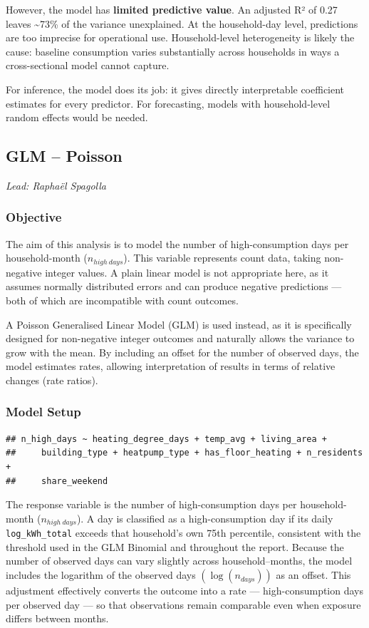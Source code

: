 \documentclass[
]{article}
\begin{document}
However, the model has \textbf{limited predictive value}. An adjusted R²
of 0.27 leaves \textasciitilde73\% of the variance unexplained. At the
household-day level, predictions are too imprecise for operational use.
Household-level heterogeneity is likely the cause: baseline consumption
varies substantially across households in ways a cross-sectional model
cannot capture.

For inference, the model does its job: it gives directly interpretable
coefficient estimates for every predictor. For forecasting, models with
household-level random effects would be needed.

\subsection{GLM -- Poisson}\label{glm-poisson}

\emph{Lead: Raphaël Spagolla}

\subsubsection{Objective}\label{objective-1}

The aim of this analysis is to model the number of high-consumption days
per household-month (\(n_{high\ days}\)). This variable represents count
data, taking non-negative integer values. A plain linear model is not
appropriate here, as it assumes normally distributed errors and can
produce negative predictions --- both of which are incompatible with
count outcomes.

A Poisson Generalised Linear Model (GLM) is used instead, as it is
specifically designed for non-negative integer outcomes and naturally
allows the variance to grow with the mean. By including an offset for
the number of observed days, the model estimates rates, allowing
interpretation of results in terms of relative changes (rate ratios).

\subsubsection{Model Setup}\label{model-setup-1}

\begin{verbatim}
## n_high_days ~ heating_degree_days + temp_avg + living_area + 
##     building_type + heatpump_type + has_floor_heating + n_residents + 
##     share_weekend
\end{verbatim}

The response variable is the number of high-consumption days per
household-month (\(n_{high\ days}\)). A day is classified as a
high-consumption day if its daily \texttt{log\_kWh\_total} exceeds that
household's own 75th percentile, consistent with the threshold used in
the GLM Binomial and throughout the report. Because the number of
observed days can vary slightly across household--months, the model
includes the logarithm of the observed days \((\log(n_{days}))\) as an
offset. This adjustment effectively converts the outcome into a rate ---
high-consumption days per observed day --- so that observations remain
comparable even when exposure differs between months.
\end{document}
